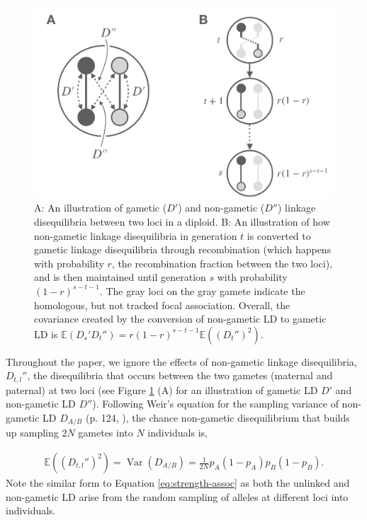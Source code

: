 \documentclass[11pt]{article}
\newcommand{\E}{\mathbb{E}}
\DeclareMathOperator{\var}{Var}
\begin{document}
\begin{figure}[!ht]
  \centering
  \includegraphics[scale=0.70]{./images/keynote-cartoons-wide.pdf}

  \caption{A: An illustration of gametic ($D'$) and non-gametic ($D''$) linkage
    disequilibria between two loci in a diploid. B: An illustration of how
    non-gametic linkage disequilibria in generation $t$ is converted to gametic
    linkage disequilibria through recombination (which happens with probability
    $r$, the recombination fraction between the two loci), and is then
    maintained until generation $s$ with probability $(1-r)^{s-t-1}$. The gray
    loci on the gray gamete indicate the homologous, but not tracked focal
    association. Overall, the covariance created by the conversion of non-gametic
    LD to gametic LD is $\E(D_{s}' D_{t}'') = r(1-r)^{s-t-1}\E\left((D_{t}'')^2\right)$.}

  \label{fig:ld-cartoon}
\end{figure}


Throughout the paper, we ignore the effects of non-gametic linkage
disequilibria, $D_{t,l}''$, the disequilibria that occurs between the two
gametes (maternal and paternal) at two loci (see Figure \ref{fig:ld-cartoon}
(A) for an illustration of gametic LD $D'$ and non-gametic LD $D''$). Following
Weir's equation for the sampling variance of non-gametic LD $D_{A/B}$ (p. 124,
\citeyear{Weir1996-mv}), the chance non-gametic disequilibrium that builds up
sampling $2N$ gametes into $N$ individuals is,

\begin{align}
  \E\left((D_{t,l}'')^2\right) = \var(D_{A/B})  = \frac{1}{2N} p_A (1-p_A) p_B (1-p_B).
  \label{eq:non-gametic}
\end{align}
%
Note the similar form to Equation \eqref{eq:strength-assoc} as both the
unlinked and non-gametic LD arise from the random sampling of alleles at
different loci into individuals.
\end{document}
